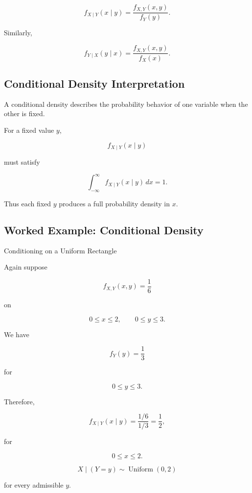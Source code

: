 \[
\boxed{
f_{X\mid Y}(x\mid y)
=
\frac{
f_{X,Y}(x,y)
}{
f_Y(y)
}.
}
\]

Similarly,

\[
\boxed{
f_{Y\mid X}(y\mid x)
=
\frac{
f_{X,Y}(x,y)
}{
f_X(x)
}.
}
\]

\subsection{Conditional Density Interpretation}
\label{subsec:conditional-density-interpretation}

A conditional density describes the probability behavior of one
variable when the other is fixed.

For a fixed value \(y\),

\[
f_{X\mid Y}(x\mid y)
\]

must satisfy

\[
\boxed{
\int_{-\infty}^{\infty}
f_{X\mid Y}(x\mid y)\,dx
=
1.
}
\]

Thus each fixed \(y\) produces a full probability density in \(x\).

\subsection{Worked Example: Conditional Density}
\label{subsec:worked-conditional-density}

\begin{workedexamplebox}{Conditioning on a Uniform Rectangle}

Again suppose

\[
f_{X,Y}(x,y)
=
\frac16
\]

on

\[
0\leq x\leq2,
\qquad
0\leq y\leq3.
\]

We have

\[
f_Y(y)=\frac13
\]

for

\[
0\leq y\leq3.
\]

Therefore,

\[
f_{X\mid Y}(x\mid y)
=
\frac{1/6}{1/3}
=
\frac12,
\]

for

\[
0\leq x\leq2.
\]

\begin{answerbox}
\[
\boxed{
X\mid(Y=y)
\sim
\operatorname{Uniform}(0,2)
}
\]

for every admissible \(y\).
\end{answerbox}

\end{workedexamplebox}

